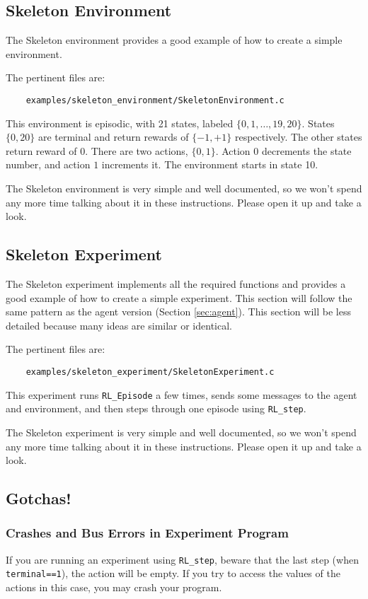 \documentclass[11pt]{article}
\begin{document}
\subsection{Skeleton Environment}
\label{sec:env}
The Skeleton environment provides a good example of how to create a simple environment. 

The pertinent files are:
\begin{verbatim}
	examples/skeleton_environment/SkeletonEnvironment.c
\end{verbatim}

This environment is episodic, with 21 states, labeled $\{0, 1,\ldots,19,20\}$. States $\{0, 20\}$ are terminal and return rewards of $\{-1, +1\}$ respectively.  The other states return reward of $0$.
There are two actions, $\{0, 1\}$.  Action $0$ decrements the state number, and action $1$ increments it. The environment starts in state 10.

The Skeleton environment is very simple and well documented, so we won't spend any more time talking about it in these instructions.
Please open it up and take a look.


\subsection{Skeleton Experiment}
The Skeleton experiment implements all the required functions and provides a good example of how to create a simple experiment.  This section will follow the same 
pattern as the agent version (Section \ref{sec:agent}).  This section will be less detailed because many ideas are similar or identical.

The pertinent files are:
\begin{verbatim}
	examples/skeleton_experiment/SkeletonExperiment.c
\end{verbatim}

This experiment runs \texttt{RL\_Episode} a few times, sends some messages to the agent and environment, and then steps through one episode using \texttt{RL\_step}.

The Skeleton experiment is very simple and well documented, so we won't spend any more time talking about it in these instructions.
Please open it up and take a look.



\subsection{Gotchas!}
\subsubsection{Crashes and Bus Errors in Experiment Program}
If you are running an experiment using \texttt{RL\_step}, beware that the last step (when \texttt{terminal==1}), the action will be empty.  If you try to access the values of the actions in this 
case, you may crash your program.
\end{document}
